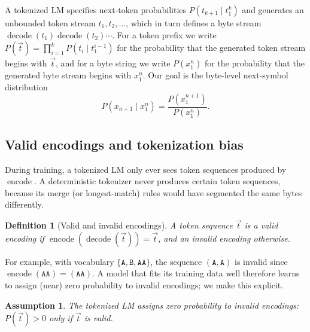 \documentclass{article} %
\newtheorem{definition}{Definition}
\newtheorem{assumption}{Assumption}
\newcommand{\enc}{\operatorname{encode}}
\newcommand{\dec}{\operatorname{decode}}
\newcommand{\tseq}{\vec{t}}
\newcommand{\tok}[1]{\texttt{#1}}
\begin{document}
A tokenized LM specifies next-token probabilities $P(t_{k+1}\mid t_1^k)$ and generates an unbounded token stream $t_1, t_2, \dots$, which in turn defines a byte stream $\dec(t_1)\dec(t_2)\cdots$. For a token prefix we write $P(\tseq) = \prod_{i=1}^{k} P(t_i\mid t_1^{i-1})$ for the probability that the generated token stream begins with $\tseq$, and for a byte string we write $P(x_1^n)$ for the probability that the generated byte stream begins with $x_1^n$. Our goal is the byte-level next-symbol distribution
\begin{equation}
P(x_{n+1}\mid x_1^n) = \frac{P(x_1^{n+1})}{P(x_1^n)}.
\label{eq:next_byte}
\end{equation}

\subsection{Valid encodings and tokenization bias}
\label{sec:bias}
During training, a tokenized LM only ever sees token sequences produced by $\enc$. A deterministic tokenizer never produces certain token sequences, because its merge (or longest-match) rules would have segmented the same bytes differently.

\begin{definition}[Valid and invalid encodings]
\label{def:valid}
A token sequence $\tseq$ is a \emph{valid encoding} if $\enc(\dec(\tseq)) = \tseq$, and an \emph{invalid encoding} otherwise.
\end{definition}

For example, with vocabulary $\{\tok{A},\tok{B},\tok{AA}\}$, the sequence $(\tok{A},\tok{A})$ is invalid since $\enc(\tok{AA}) = (\tok{AA})$. A model that fits its training data well therefore learns to assign (near) zero probability to invalid encodings; we make this explicit.

\begin{assumption}
\label{ass:invalid}
The tokenized LM assigns zero probability to invalid encodings: $P(\tseq) > 0$ only if $\tseq$ is valid.
\end{assumption}
\end{document}
